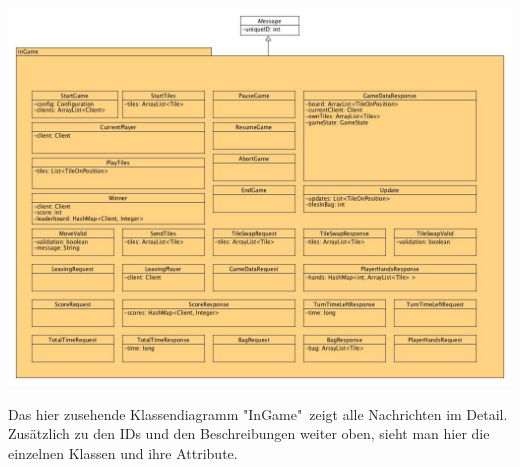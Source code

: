 \documentclass[a4paper, 10pt]{article}
\begin{document}
\includegraphics[width=\textwidth]{media/ClassInGame}\par
Das hier zusehende Klassendiagramm "{InGame}"\ zeigt alle Nachrichten im Detail. Zusätzlich zu den IDs und den Beschreibungen weiter oben, sieht man hier die einzelnen Klassen und ihre Attribute.\par
\end{document}
